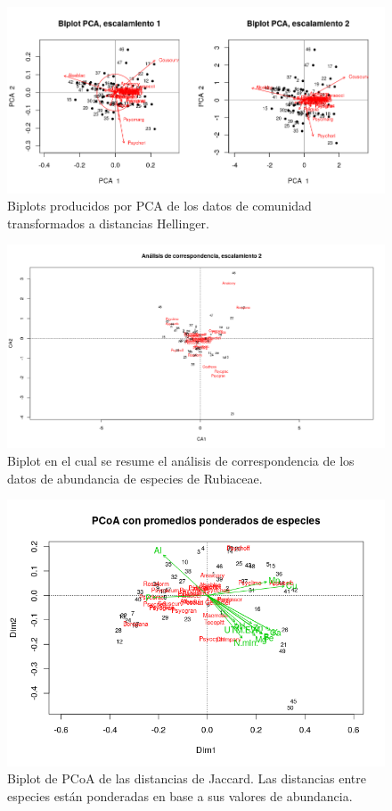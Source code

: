 \documentclass[11pt,]{article}
\begin{document}
\begin{figure}
\centering
\includegraphics{pca_biplot_sps.png}
\caption{Biplots producidos por PCA de los datos de comunidad
transformados a distancias Hellinger. \label{fig:pca_biplot_sps}}
\end{figure}

\begin{figure}
\centering
\includegraphics{biplot_correspndncia_sps_escal_2.png}
\caption{Biplot en el cual se resume el análisis de correspondencia de
los datos de abundancia de especies de Rubiaceae.
\label{fig:biplot_correspndncia_sps_escal_2}}
\end{figure}

\begin{figure}
\centering
\includegraphics{pcoa_sps_jacc_var_ambient.png}
\caption{Biplot de PCoA de las distancias de Jaccard. Las distancias
entre especies están ponderadas en base a sus valores de abundancia.
\label{fig:pcoa_sps_jacc_var_ambient}}
\end{figure}
\end{document}
